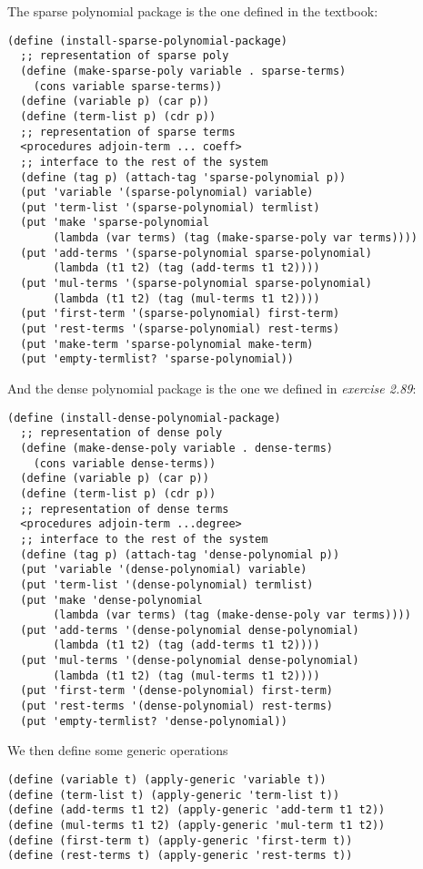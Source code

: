 \documentclass[a4paper,12pt]{article}
\begin{document}
The sparse polynomial package is the one defined in the textbook:
\begin{lstlisting}
(define (install-sparse-polynomial-package)
  ;; representation of sparse poly
  (define (make-sparse-poly variable . sparse-terms)
    (cons variable sparse-terms))
  (define (variable p) (car p))
  (define (term-list p) (cdr p))
  ;; representation of sparse terms
  <procedures adjoin-term ... coeff>
  ;; interface to the rest of the system
  (define (tag p) (attach-tag 'sparse-polynomial p))
  (put 'variable '(sparse-polynomial) variable)
  (put 'term-list '(sparse-polynomial) termlist)
  (put 'make 'sparse-polynomial
       (lambda (var terms) (tag (make-sparse-poly var terms))))
  (put 'add-terms '(sparse-polynomial sparse-polynomial)
       (lambda (t1 t2) (tag (add-terms t1 t2))))
  (put 'mul-terms '(sparse-polynomial sparse-polynomial)
       (lambda (t1 t2) (tag (mul-terms t1 t2))))
  (put 'first-term '(sparse-polynomial) first-term)
  (put 'rest-terms '(sparse-polynomial) rest-terms)
  (put 'make-term 'sparse-polynomial make-term)
  (put 'empty-termlist? 'sparse-polynomial))
\end{lstlisting}
And the dense polynomial package is the one we defined in
\emph{exercise 2.89}:
\begin{lstlisting}
(define (install-dense-polynomial-package)
  ;; representation of dense poly
  (define (make-dense-poly variable . dense-terms)
    (cons variable dense-terms))
  (define (variable p) (car p))
  (define (term-list p) (cdr p))
  ;; representation of dense terms
  <procedures adjoin-term ...degree>
  ;; interface to the rest of the system
  (define (tag p) (attach-tag 'dense-polynomial p))
  (put 'variable '(dense-polynomial) variable)
  (put 'term-list '(dense-polynomial) termlist)
  (put 'make 'dense-polynomial
       (lambda (var terms) (tag (make-dense-poly var terms))))
  (put 'add-terms '(dense-polynomial dense-polynomial)
       (lambda (t1 t2) (tag (add-terms t1 t2))))
  (put 'mul-terms '(dense-polynomial dense-polynomial)
       (lambda (t1 t2) (tag (mul-terms t1 t2))))
  (put 'first-term '(dense-polynomial) first-term)
  (put 'rest-terms '(dense-polynomial) rest-terms)
  (put 'empty-termlist? 'dense-polynomial))
\end{lstlisting}
We then define some generic operations
\begin{lstlisting}
(define (variable t) (apply-generic 'variable t))
(define (term-list t) (apply-generic 'term-list t))
(define (add-terms t1 t2) (apply-generic 'add-term t1 t2))
(define (mul-terms t1 t2) (apply-generic 'mul-term t1 t2))
(define (first-term t) (apply-generic 'first-term t))
(define (rest-terms t) (apply-generic 'rest-terms t))
\end{lstlisting}
\end{document}
